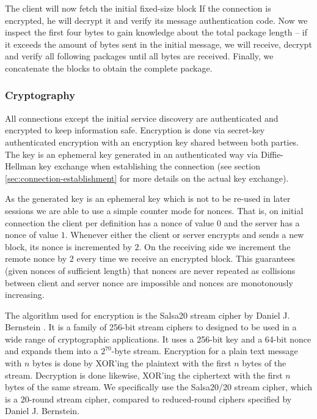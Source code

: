 The client will now fetch the initial fixed-size block
If the connection is encrypted, he will decrypt it and verify its message authentication code.
Now we inspect the first four bytes to gain knowledge about the total package length -- if it exceeds the amount of bytes sent in the initial message, we will receive, decrypt and verify all following packages until all bytes are received.
Finally, we concatenate the blocks to obtain the complete package.

\subsubsection{Cryptography}

All connections except the initial service discovery are authenticated and encrypted to keep information safe.
Encryption is done via secret-key authenticated encryption with an encryption key shared between both parties.
The key is an ephemeral key generated in an authenticated way via Diffie-Hellman key exchange when establishing the connection (see section \ref{sec:connection-establishment} for more details on the actual key exchange).

As the generated key is an ephemeral key which is not to be re-used in later sessions we are able to use a simple counter mode for nonces.
That is, on initial connection the client per definition has a nonce of value $0$ and the server has a nonce of value $1$.
Whenever either the client or server encrypts and sends a new block, its nonce is incremented by $2$.
On the receiving side we increment the remote nonce by $2$ every time we receive an encrypted block.
This guarantees (given nonces of sufficient length) that nonces are never repeated as collisions between client and server nonce are impossible and nonces are monotonously increasing.

The algorithm used for encryption is the Salsa20 stream cipher by Daniel J. Bernstein \cite{bernstein2008salsa}.
It is a family of 256-bit stream ciphers to designed to be used in a wide range of cryptographic applications.
It uses a 256-bit key and a 64-bit nonce and expands them into a $2^{70}$-byte stream.
Encryption for a plain text message with $n$ bytes is done by XOR'ing the plaintext with the first $n$ bytes of the stream.
Decryption is done likewise, XOR'ing the ciphertext with the first $n$ bytes of the same stream.
We specifically use the Salsa20/20 stream cipher, which is a 20-round stream cipher, compared to reduced-round ciphers specified by Daniel J. Bernstein.

